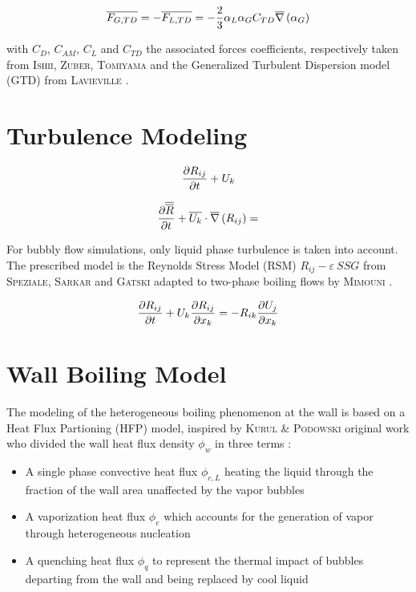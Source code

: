 \begin{equation}
\label{eq:turb_disp}
\overline{F_{G,TD}}=-\overline{F_{L,TD}}=-\frac{2}{3}\alpha_{L}\alpha_{G}C_{TD}\overline{\nabla}\left({\alpha_{G}}\right)
\end{equation}

with $C_{D}$, $C_{AM}$, $C_{L}$ and $C_{TD}$ the associated forces coefficients, respectively taken from \textsc{Ishii}\cite{ishii1967}, \textsc{Zuber}\cite{zuber1964}, \textsc{Tomiyama}\cite{tomiyama2002} and the Generalized Turbulent Dispersion model (GTD) from \textsc{Lavieville} \etal \cite{lavieville2017}.

\section{Turbulence Modeling}
\label{subsec:turbulence}

\begin{equation}
\frac{\partial{R_{ij}}}{\partial t} + U_{k}
\end{equation}

\begin{equation}
\frac{\partial{\overline{\overline{R}}}}{\partial t} + \overline{U_{k}}\cdot \overline{\nabla}\left({R_{ij}}\right) = 
\end{equation}

For bubbly flow simulations, only liquid phase turbulence is taken into account. The prescribed model is the Reynolds Stress Model (RSM) $R_{ij}-\varepsilon~SSG$ from \textsc{Speziale}, \textsc{Sarkar} and \textsc{Gatski}\cite{speziale1991} adapted to two-phase boiling flows by \textsc{Mimouni} \etal\cite{mimouni2011}.

\begin{equation}
\frac{\partial{R_{ij}}}{\partial t} + U_{k}\frac{\partial R_{ij}}{\partial x_{k}} = - R_{ik} \frac{\partial U_{j}}{\partial x_{k}}
\end{equation}


\section{Wall Boiling Model}
\label{subsec:HFP}

The modeling of the heterogeneous boiling phenomenon at the wall is based on a Heat Flux Partioning (HFP) model, inspired by \textsc{Kurul} \& \textsc{Podowski} original work\cite{kurul1990} who divided the wall heat flux density $\phi_{w}$ in three terms  :

\begin{itemize}
\item A single phase convective heat flux $\phi_{c,L}$ heating the liquid through the fraction of the wall area unaffected by the vapor bubbles
\item A vaporization heat flux $\phi_{e}$ which accounts for the generation of vapor through heterogeneous nucleation
\item A quenching heat flux $\phi_{q}$ to represent the thermal impact of bubbles departing from the wall and being replaced by cool liquid
\end{itemize}


